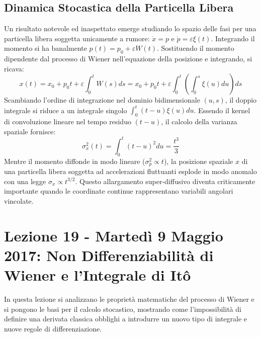 \documentclass[12pt,a4paper]{article}
\begin{document}
\subsection{Dinamica Stocastica della Particella Libera}
Un risultato notevole ed inaspettato emerge studiando lo spazio delle fasi per una particella libera soggetta unicamente a rumore: $\dot{x} = p$ e $\dot{p} = \varepsilon \xi(t)$. Integrando il momento si ha banalmente $p(t) = p_0 + \varepsilon W(t)$. 
Sostituendo il momento dipendente dal processo di Wiener nell'equazione della posizione e integrando, si ricava:
\begin{equation}
x(t) = x_0 + p_0 t + \varepsilon \int_0^t W(s)ds = x_0 + p_0 t + \varepsilon \int_0^t \left( \int_0^s \xi(u)du \right) ds
\end{equation}
Scambiando l'ordine di integrazione nel dominio bidimensionale $(u,s)$, il doppio integrale si riduce a un integrale singolo $\int_0^t (t-u)\xi(u)du$. Essendo il kernel di convoluzione lineare nel tempo residuo $(t-u)$, il calcolo della varianza spaziale fornisce:
\begin{equation}
\sigma_x^2(t) = \int_0^t (t-u)^2 du = \frac{t^3}{3}
\end{equation}
Mentre il momento diffonde in modo lineare ($\sigma_p^2 \propto t$), la posizione spaziale $x$ di una particella libera soggetta ad accelerazioni fluttuanti esplode in modo anomalo con una legge $\sigma_x \propto t^{3/2}$. Questo allargamento super-diffusivo diventa criticamente importante quando le coordinate continue rappresentano variabili angolari vincolate.

\newpage
\section{Lezione 19 - Martedì 9 Maggio 2017: Non Differenziabilità di Wiener e l'Integrale di Itô}

In questa lezione si analizzano le proprietà matematiche del processo di Wiener e si pongono le basi per il calcolo stocastico, mostrando come l'impossibilità di definire una derivata classica obblighi a introdurre un nuovo tipo di integrale e nuove regole di differenziazione.
\end{document}
